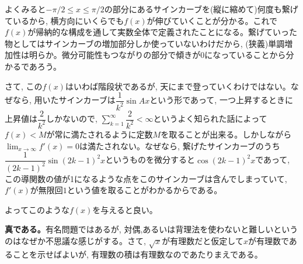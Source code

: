 よくみると$-\pi/2\leq x\leq \pi/2$の部分にあるサインカーブを(縦に縮めて)何度も繋げているから, 横方向にいくらでも$f(x)$が伸びていくことが分かる。これで$f(x)$が帰納的な構成を通して実数全体で定義されたことになる。繋げていった物としてはサインカーブの増加部分しか使っていないわけだから, (狭義)単調増加性は明らか。微分可能性もつながりの部分で傾きが$0$になっていることから分かるであろう。

さて, この$f(x)$はいわば階段状であるが, 天にまで登っていくわけではない。なぜなら, 用いたサインカーブは$\dfrac{1}{k^2}\sin{Ax}$という形であって, 一つ上昇するときに上昇値は$\dfrac{2}{k^2}$しかないので, $\sum_{k=1}^{\infty}\dfrac{2}{k^2}<\infty$というよく知られた話によって$f(x)<M$が常に満たされるように定数$M$を取ることが出来る。しかしながら$\lim_{x\to \infty} f'(x) = 0$は満たされない。なぜなら, 繋げたサインカーブのうち$\dfrac{1}{(2k-1)^2}\sin{(2k-1)^2x}$というものを微分すると$\cos{(2k-1)^2x}$であって, この導関数の値が1になるような点をこのサインカーブは含んでしまっていて, $f'(x)$が無限回$1$という値を取ることがわかるからである。

よってこのような$f(x)$を与えると良い。

\textbf{真である。}有名問題ではあるが, 対偶,あるいは背理法を使わないと難しいというのはなぜか不思議な感じがする。さて, $\sqrt{x}$が有理数だと仮定して$x$が有理数であることを示せばよいが, 有理数の積は有理数なのであたりまえである。